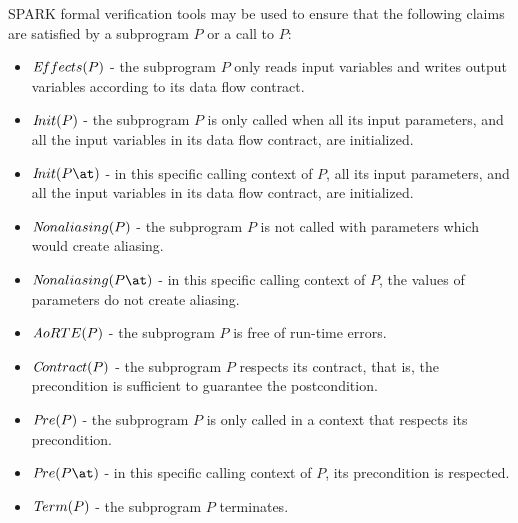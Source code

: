 \documentclass{llncs}
\newcommand{\spark}{SPARK\xspace}
\begin{document}
\spark formal verification tools may be used to ensure that the following
claims are satisfied by a subprogram $P$ or a call to $P$:
\begin{itemize}
   \item ${\textit Effects}(P)$ - the subprogram $P$ only reads
   input variables and writes output variables according to its data flow contract.
   \item ${\textit Init}(P)$ - the subprogram $P$ is only called when all
   its input parameters, and all the input variables in its data flow contract,
   are initialized.
   \item ${\textit Init}(P\at)$ - in this specific calling context of $P$,
   all its input parameters, and all the input variables in its data flow contract,
   are initialized.
   \item ${\textit Nonaliasing}(P)$ - the subprogram $P$ is not called with
   parameters which would create aliasing.
   \item ${\textit Nonaliasing}(P\at)$ - in this specific calling context of $P$,
   the values of parameters do not create aliasing.
   \item ${\textit AoRTE}(P)$ - the subprogram $P$ is free of run-time errors.
   \item ${\textit Contract}(P)$ - the subprogram $P$ respects its contract,
   that is, the precondition is sufficient to guarantee the postcondition.
   \item ${\textit Pre}(P)$ - the subprogram $P$ is only called in a context
   that respects its precondition.
   \item ${\textit Pre}(P\at)$ - in this specific calling context of $P$,
   its precondition is respected.
   \item ${\textit Term}(P)$ - the subprogram $P$ terminates.
\end{itemize}
\end{document}
